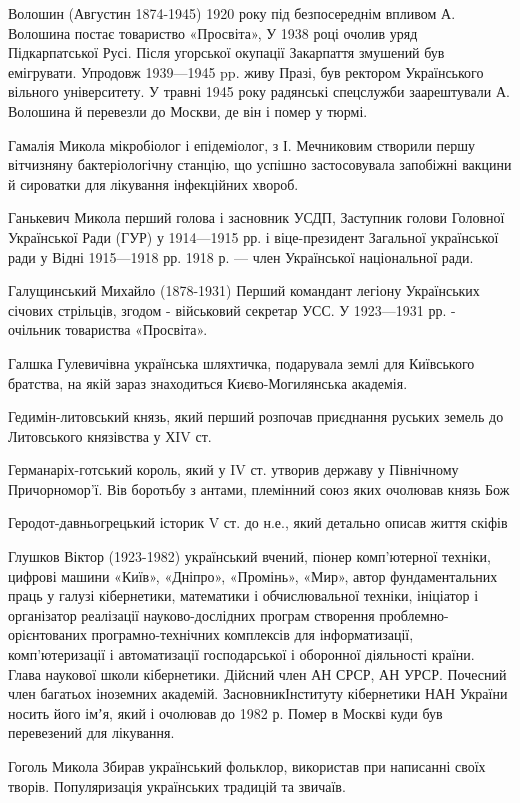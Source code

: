 Волошин (Августин 1874-1945) 1920 року під безпосереднім впливом А. Волошина постає товариство «Просвіта», У 1938 році очолив уряд Підкарпатської Русі. Після угорської окупації Закарпаття змушений був емігрувати. Упродовж 1939—1945 pp. живу Празі, був ректором Українського вільного університету. У травні 1945 року радянські спецслужби заарештували А. Волошина й перевезли до Москви, де він і помер у тюрмі.

Гамалія Микола  мікробіолог і епідеміолог, з І. Мечниковим створили першу вітчизняну бактеріологічну станцію, що успішно застосовувала запобіжні вакцини й сироватки для лікування інфекційних хвороб.

Ганькевич Микола перший голова і засновник УСДП,  Заступник голови Головної Української Ради (ГУР) у 1914—1915 рр. і віце-президент Загальної української ради у Відні 1915—1918 рр. 1918 р. — член Української національної ради. 

Галущинський Михайло (1878-1931) Перший командант легіону Українських січових стрільців, згодом - військовий секретар УСС.  У 1923—1931 рр. - очільник товариства «Просвіта».

Галшка Гулевичівна українська шляхтичка, подарувала землі для Київського братства, на якій зараз знаходиться Києво-Могилянська академія.

Гедимін-литовський князь, який перший розпочав приєднання руських земель до Литовського князівства у ХIV ст.

Германаріх-готський король, який у IV ст. утворив державу у Північному Причорномор’ї. Вів боротьбу з антами, племінний союз яких очолював князь Бож

Геродот-давньогрецький історик V ст. до н.е., який детально описав життя скіфів

Глушков Віктор (1923-1982) український вчений, піонер комп'ютерної техніки, цифрові машини «Київ», «Дніпро», «Промінь», «Мир», автор фундаментальних праць у галузі кібернетики, математики і обчислювальної техніки, ініціатор і організатор реалізації науково-дослідних програм створення проблемно-орієнтованих програмно-технічних комплексів для інформатизації, комп'ютеризації і автоматизації господарської і оборонної діяльності країни. Глава наукової школи кібернетики. Дійсний член АН СРСР, АН УРСР. Почесний член багатьох іноземних академій. ЗасновникІнституту кібернетики  НАН України носить його імʼя, який і очолював до 1982 р. Помер в Москві куди був перевезений для лікування. 

Гоголь Микола Збирав український фольклор, використав при написанні своїх творів. Популяризація українських традицій та звичаїв.

